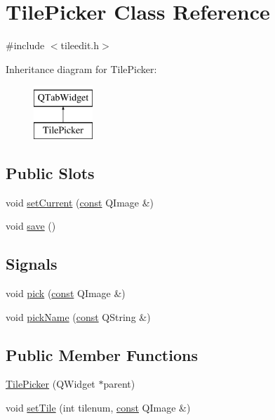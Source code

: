 \hypertarget{classTilePicker}{\section{Tile\+Picker Class Reference}
\label{classTilePicker}
}


{\ttfamily \#include $<$tileedit.\+h$>$}

Inheritance diagram for Tile\+Picker\+:\begin{figure}[H]
\begin{center}
\leavevmode
\includegraphics[height=2.000000cm]{classTilePicker}
\end{center}
\end{figure}
\subsection*{Public Slots}
\begin{DoxyCompactItemize}
\item 
void \hyperlink{classTilePicker_a7b5d0206268b013c281cf2f592f37394}{set\+Current} (\hyperlink{tradstdc_8h_a2c212835823e3c54a8ab6d95c652660e}{const} Q\+Image \&)
\item 
void \hyperlink{classTilePicker_a68f48cfe38298fa101e231e3abe158e7}{save} ()
\end{DoxyCompactItemize}
\subsection*{Signals}
\begin{DoxyCompactItemize}
\item 
void \hyperlink{classTilePicker_a40685c562bc46053fac7d7a73e82a939}{pick} (\hyperlink{tradstdc_8h_a2c212835823e3c54a8ab6d95c652660e}{const} Q\+Image \&)
\item 
void \hyperlink{classTilePicker_af1d44dedfa850d0f81a61ddee0b7a292}{pick\+Name} (\hyperlink{tradstdc_8h_a2c212835823e3c54a8ab6d95c652660e}{const} Q\+String \&)
\end{DoxyCompactItemize}
\subsection*{Public Member Functions}
\begin{DoxyCompactItemize}
\item 
\hyperlink{classTilePicker_a60e33231d333d70be57e3fed23c760d4}{Tile\+Picker} (Q\+Widget $\ast$parent)
\item 
void \hyperlink{classTilePicker_a4cc3fce146d351ed6c28833b36f02880}{set\+Tile} (int tilenum, \hyperlink{tradstdc_8h_a2c212835823e3c54a8ab6d95c652660e}{const} Q\+Image \&)
\end{DoxyCompactItemize}


